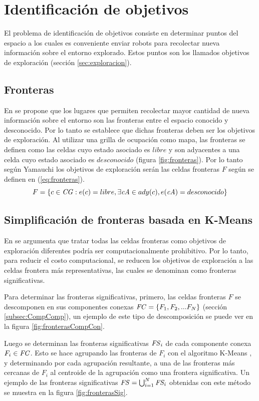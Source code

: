 \section{Identificación de objetivos}\label{sec:pc:idobj}
El problema de identificación de objetivos consiste en determinar puntos
del espacio a los cuales es conveniente enviar robots para recolectar nueva
información sobre el entorno explorado. Estos puntos son los llamados objetivos
de exploración (sección \ref{sec:exploracion}). 

\subsection{Fronteras}\label{subsec:todasFront}
En \cite{yamauchi1997frontier} se propone que los lugares que permiten
recolectar mayor cantidad de nueva información sobre el entorno son las
fronteras entre el espacio conocido y desconocido. Por lo tanto se establece que dichas
fronteras deben ser los objetivos de exploración.
Al utilizar una grilla de ocupación como mapa, las fronteras se definen como las
celdas cuyo estado asociado es $libre$ y son adyacentes a una celda cuyo estado
asociado es $desconocido$ (figura \ref{fig:fronteras}).
Por lo tanto según Yamauchi los objetivos de exploración serán las celdas
fronteras $F$ según se definen en (\ref{eq:fronteras}).
\begin{equation} 
  F = \{ c \in \mathit{CG} : e(c) = libre, \exists \mathit{cA} \in ady(c), e(\mathit{cA}) = desconocido  \}
  \label{eq:fronteras}
\end{equation}

\subsection{Simplificación de fronteras basada en K-Means}\label{subsec:simpKM}
En \cite{Amorin2019} se argumenta que tratar todas las celdas fronteras como
objetivos de exploración diferentes podría ser computacionalmente prohibitivo.
Por lo tanto, para reducir el costo computacional, se reducen los objetivos de
exploración a las celdas frontera más representativas, las cuales se
denominan como fronteras significativas.

Para determinar las fronteras significativas, primero, las celdas fronteras $F$
se descomponen en sus componentes conexas $\mathit{FC}=\{F_1,F_2,...F_N\}$
(sección \ref{subsec:CompComp}), un ejemplo de este tipo de descomposición se
puede ver en la figura \ref{fig:fronterasCompCon}.

Luego se determinan las fronteras significativas $\mathit{FS}_i$ de cada
componente conexa $F_i\in \mathit{FC}$. Esto se hace agrupando las fronteras de
$F_i$ con el algoritmo K-Means \cite{macqueen1967some}, y determinando por cada
agrupación resultante, a una de las fronteras más cercanas de $F_i$ al
centroide de la agrupación como una frontera significativa. Un ejemplo de
las fronteras significativas $\mathit{FS} = \bigcup_{i=1}^N \mathit{FS_i}$ obtenidas
con este método se muestra en la figura \ref{fig:fronterasSig}.

